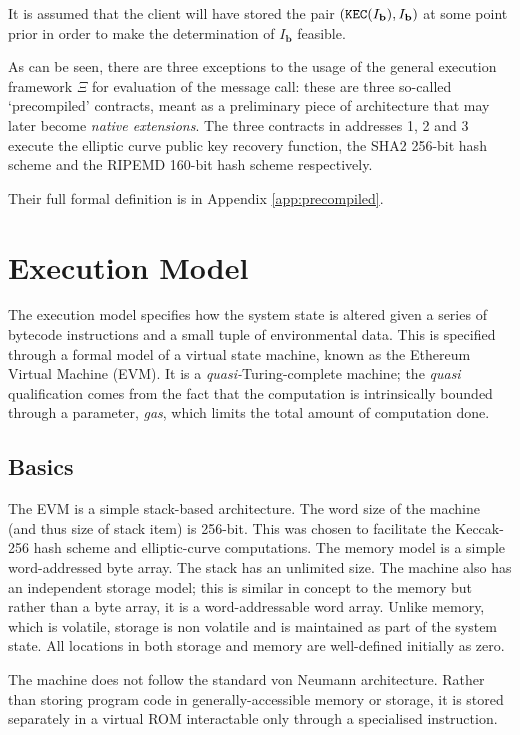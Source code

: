 \documentclass[9pt,oneside]{amsart}
\begin{document}
\begin{multicols}{2}
It is assumed that the client will have stored the pair $(\mathtt{\tiny KEC}(I_\mathbf{b}), I_\mathbf{b})$ at some point prior in order to make the determination of $I_\mathbf{b}$ feasible.

As can be seen, there are three exceptions to the usage of the general execution framework $\Xi$ for evaluation of the message call: these are three so-called `precompiled' contracts, meant as a preliminary piece of architecture that may later become \textit{native extensions}. The three contracts in addresses 1, 2 and 3 execute the elliptic curve public key recovery function, the SHA2 256-bit hash scheme and the RIPEMD 160-bit hash scheme respectively.

Their full formal definition is in Appendix \ref{app:precompiled}.

\section{Execution Model} \label{ch:model}

The execution model specifies how the system state is altered given a series of bytecode instructions and a small tuple of environmental data. This is specified through a formal model of a virtual state machine, known as the Ethereum Virtual Machine (EVM). It is a \textit{quasi-}Turing-complete machine; the \textit{quasi} qualification comes from the fact that the computation is intrinsically bounded through a parameter, \textit{gas}, which limits the total amount of computation done.

\subsection{Basics}

The EVM is a simple stack-based architecture. The word size of the machine (and thus size of stack item) is 256-bit. This was chosen to facilitate the Keccak-256 hash scheme and elliptic-curve computations. The memory model is a simple word-addressed byte array. The stack has an unlimited size. The machine also has an independent storage model; this is similar in concept to the memory but rather than a byte array, it is a word-addressable word array. Unlike memory, which is volatile, storage is non volatile and is maintained as part of the system state. All locations in both storage and memory are well-defined initially as zero.

The machine does not follow the standard von Neumann architecture. Rather than storing program code in generally-accessible memory or storage, it is stored separately in a virtual ROM interactable only through a specialised instruction.


\end{multicols}
\end{document}
